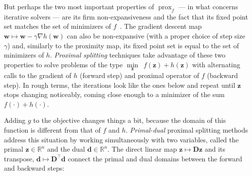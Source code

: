 But perhaps the two most important properties of $\operatorname{prox}_{f}$ --- in what concerns iterative solvers --- are its firm non-expansiveness and the fact that its fixed point set matches the set of minimizers of $f$~\cite{combettes2011}. The gradient descent map $\mathbf{w} \mapsto \mathbf{w} - \gamma \nabla h (\mathbf{w})$ can also be non-expansive (with a proper choice of step size $\gamma$) and, similarly to the proximity map, its fixed point set is equal to the set of minimizers of $h$. \emph{Proximal splitting} techniques take advantage of these two properties to solve problems of the type $\underset{\mathbf{z}}{\min} \enspace f(\mathbf{z}) + h(\mathbf{z})$ with alternating calls to the gradient of $h$ (forward step) and proximal operator of $f$ (backward step). In rough terms, the iterations look like the ones below and repeat until $\mathbf{z}$ stops changing noticeably, coming close enough to a minimizer of the sum $f(\cdot) + h(\cdot)$.
\begin{algorithm}[H]
    \begin{algorithmic}
        \State{$\ldots$}
    \end{algorithmic}
\end{algorithm}

Adding $g$ to the objective changes things a bit, because the domain of this function is different from that of $f$ and $h$. \emph{Primal-dual} proximal splitting methods address this situation by working simultaneously with two variables, called the primal $\mathbf{z} \in \mathbb{R}^{n}$ and the dual $\mathbf{d} \in \mathbb{R}^{n}$. The direct linear map $\mathbf{z} \mapsto \mathbf{D}\mathbf{z}$ and its transpose, $\mathbf{d} \mapsto \mathbf{D}^\top \mathbf{d}$ connect the primal and dual domains between the forward and backward steps:
\begin{algorithm}[H]
    \begin{algorithmic}
        \State{$\ldots$}
    \end{algorithmic}
\end{algorithm}

